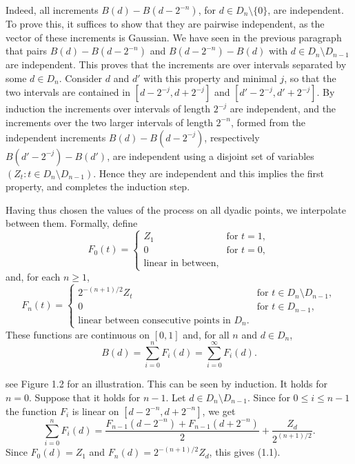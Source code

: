 \documentclass{article}
\begin{document}
Indeed, all increments $B(d) - B(d - 2^{-n})$, for $d \in D_n \setminus \{ 0 \}$, are independent. To prove this, it suffices to show that they are pairwise independent, as the vector of these increments is Gaussian. We have seen in the previous paragraph that pairs $B(d) - B(d - 2^{-n})$ and $B(d - 2^{-n}) - B(d)$ with $d \in D_n \setminus D_{n-1}$ are independent. This proves that the increments are over intervals separated by some $d \in D_n$. Consider $d$ and $d'$ with this property and minimal $j$, so that the two intervals are contained in $[d - 2^{-j}, d + 2^{-j}]$ and $[d' - 2^{-j}, d' + 2^{-j}]$. By induction the increments over intervals of length $2^{-j}$ are independent, and the increments over the two larger intervals of length $2^{-n}$, formed from the independent increments $B(d) - B(d - 2^{-j})$, respectively $B(d' - 2^{-j}) - B(d')$, are independent using a disjoint set of variables $(Z_t : t \in D_n \setminus D_{n-1})$. Hence they are independent and this implies the first property, and completes the induction step.


Having thus chosen the values of the process on all dyadic points, we interpolate between them. Formally, define
\[
    F_0(t) = 
    \begin{cases} 
        Z_1 & \text{for } t = 1, \\
        0 & \text{for } t = 0, \\
        \text{linear in between}, 
    \end{cases}
\]
and, for each $n \geq 1$,
\[
    F_n(t) = 
    \begin{cases} 
        2^{-(n+1)/2} Z_t & \text{for } t \in D_n \setminus D_{n-1}, \\
        0 & \text{for } t \in D_{n-1}, \\
        \text{linear between consecutive points in } D_n.
    \end{cases}
\]
These functions are continuous on $[0, 1]$ and, for all $n$ and $d \in D_n$,
\[
    B(d) = \sum_{i=0}^{n} F_i(d) = \sum_{i=0}^{\infty} F_i(d). \tag{1.1}
\]


see Figure 1.2 for an illustration. This can be seen by induction. It holds for $n = 0$. Suppose that it holds for $n - 1$. Let $d \in D_n \setminus D_{n-1}$. Since for $0 \leq i \leq n - 1$ the function $F_i$ is linear on $[d - 2^{-n}, d + 2^{-n}]$, we get
\[
    \sum_{i=0}^{n} F_i(d) = \frac{F_{n-1}(d - 2^{-n}) + F_{n-1}(d + 2^{-n})}{2} + \frac{Z_d}{2^{(n+1)/2}}.
\]
Since $F_0(d) = Z_1$ and $F_n(d) = 2^{-(n+1)/2} Z_d$, this gives (1.1).
\end{document}
